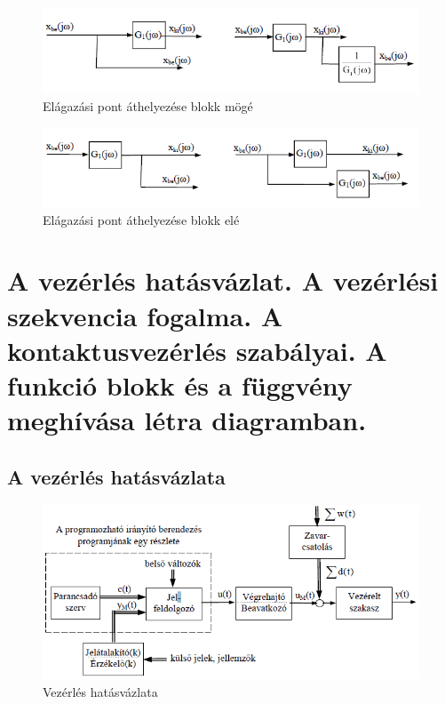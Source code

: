 \documentclass[11pt,a4paper]{article}
\begin{document}
\begin{figure}[hbtp]
    	 \centering
		\includegraphics[scale=1.0]{16_elagazas_blokk_moge.png}
		\caption{Elágazási pont áthelyezése blokk mögé}
\end{figure}
\begin{figure}[hbtp]
    	 \centering
		\includegraphics[scale=1.0]{17_elagazas_blokk_ele.png}
		\caption{Elágazási pont áthelyezése blokk elé}
\end{figure}
\newpage
\section{A vezérlés hatásvázlat. A vezérlési szekvencia fogalma. A kontaktusvezérlés szabályai. A funkció blokk és a függvény meghívása létra diagramban.}
\subsection{A vezérlés hatásvázlata}

\begin{figure}[hbtp]
    	 \centering
		\includegraphics[scale=1.0]{18_vezerles_hatas.png}
		\caption{Vezérlés hatásvázlata}
\end{figure}
\end{document}
